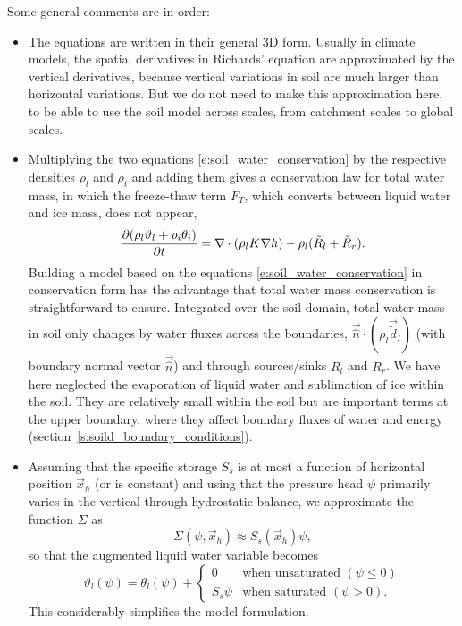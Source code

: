 \documentclass[twoside,10pt]{report}
\begin{document}
Some general comments are in order:
\begin{itemize}
\item The equations are written in their general 3D form. Usually in climate models, the spatial derivatives in Richards' equation are approximated by the vertical derivatives, because vertical variations in soil are much larger than horizontal variations. But we do not need to make this approximation here, to be able to use the soil model across scales, from catchment scales to global scales.
\item Multiplying the two equations \eqref{e:soil_water_conservation}  by the respective densities $\rho_l$ and $\rho_i$ and adding them gives a conservation law for total water mass, in which the freeze-thaw term $F_T$, which converts between liquid water and ice mass, does not appear,
\[
 \frac{\partial (\rho_l \vartheta_l + \rho_i \theta_i)}{\partial t} = \nabla \cdot (\rho_l K\nabla h) - \rho_l (\tilde{R}_l + \tilde{R}_r).
 \]
Building a model based on the equations \eqref{e:soil_water_conservation} in conservation form has the advantage that total water mass conservation is straightforward to ensure. Integrated over the soil domain, total water mass in soil only changes by water fluxes across the boundaries, $\vec{\hat n} \cdot (\rho_l \vec{\tilde d}_l)$ (with boundary normal vector $\vec{\hat n}$) and through sources/sinks $R_l$ and $R_r$. We have here neglected the evaporation of liquid water and sublimation of ice within the soil. They are relatively small within the soil but are important terms at the upper boundary, where they affect boundary fluxes of water and energy (section~\ref{s:soild_boundary_conditions}).
\item Assuming that the specific storage $S_s$ is at most a function of horizontal position $\vec{x}_h$ (or is constant) and using that the pressure head $\psi$ primarily varies in the vertical through hydrostatic balance, we approximate the function $\Sigma$ as
\begin{equation}\label{e:Sigma_approx}
    \Sigma(\psi, \vec{x}_h) \approx S_s(\vec{x}_h) \psi,
\end{equation}
so that the augmented liquid water variable becomes
\begin{equation}
    \vartheta_l(\psi) = \theta_l(\psi) +
    \begin{cases}
        0 & \text{when unsaturated } (\psi \le 0)\\
        S_s \psi & \text{when saturated } (\psi > 0).
    \end{cases}
\end{equation}
This considerably simplifies the model formulation.
\end{itemize}
\end{document}
